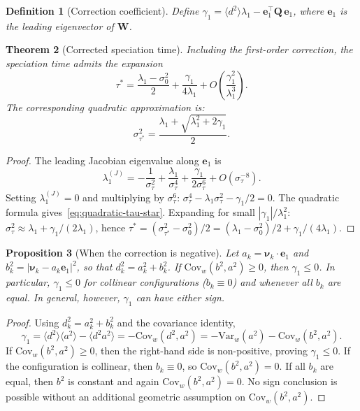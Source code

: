 \documentclass[11pt]{article}
\newtheorem{theorem}{Theorem}[section]
\newtheorem{proposition}[theorem]{Proposition}
\newtheorem{definition}[theorem]{Definition}
\newcommand{\Var}{\mathrm{Var}}
\newcommand{\Cov}{\mathrm{Cov}}
\begin{document}
\begin{definition}[Correction coefficient]\label{def:gamma}
Define $\gamma_1 = \langle d^2\rangle\lambda_1 - \bm{e}_1^\top\bm{Q}\,\bm{e}_1$, where $\bm{e}_1$ is the leading eigenvector of $\bm{W}$.
\end{definition}

\begin{theorem}[Corrected speciation time]\label{thm:corrected-speciation}
Including the first-order correction, the speciation time admits the expansion
\begin{equation}\label{eq:corrected-tau-star}
  \tau^\ast
  = \frac{\lambda_1 - \sigma_0^2}{2}
  + \frac{\gamma_1}{4\lambda_1}
  + O\!\left(\frac{\gamma_1^2}{\lambda_1^3}\right).
\end{equation}
The corresponding quadratic approximation is:
\begin{equation}\label{eq:quadratic-tau-star}
  \sigma_{\tau^\ast}^2
  = \frac{\lambda_1 + \sqrt{\lambda_1^2 + 2\gamma_1}}{2}.
\end{equation}
\end{theorem}

\begin{proof}
The leading Jacobian eigenvalue along $\bm{e}_1$ is
\[
  \lambda_1^{(J)} = -\frac{1}{\sigma_\tau^2} + \frac{\lambda_1}{\sigma_\tau^4} + \frac{\gamma_1}{2\sigma_\tau^6} + O(\sigma_\tau^{-8}).
\]
Setting $\lambda_1^{(J)} = 0$ and multiplying by $\sigma_\tau^6$: $\sigma_\tau^4 - \lambda_1\sigma_\tau^2 - \gamma_1/2 = 0$.
The quadratic formula gives~\eqref{eq:quadratic-tau-star}.
Expanding for small $|\gamma_1|/\lambda_1^2$:
$\sigma_\tau^2 \approx \lambda_1 + \gamma_1/(2\lambda_1)$,
hence $\tau^\ast = (\sigma_{\tau^\ast}^2 - \sigma_0^2)/2 = (\lambda_1 - \sigma_0^2)/2 + \gamma_1/(4\lambda_1)$.
\end{proof}

\begin{proposition}[When the correction is negative]\label{prop:gamma-sign}
Let $a_k = \bm{\nu}_k \cdot \bm{e}_1$ and $b_k^2 = |\bm{\nu}_k - a_k\bm{e}_1|^2$, so that $d_k^2 = a_k^2 + b_k^2$.
If $\Cov_w(b^2,a^2) \ge 0$, then $\gamma_1 \le 0$.
In particular, $\gamma_1 \le 0$ for collinear configurations ($b_k \equiv 0$) and whenever all $b_k$ are equal.
In general, however, $\gamma_1$ can have either sign.
\end{proposition}

\begin{proof}
Using $d_k^2 = a_k^2 + b_k^2$ and the covariance identity,
\[
  \gamma_1 = \langle d^2\rangle\langle a^2\rangle - \langle d^2 a^2\rangle
  = -\Cov_w(d^2,a^2)
  = -\Var_w(a^2) - \Cov_w(b^2,a^2).
\]
If $\Cov_w(b^2,a^2) \ge 0$, then the right-hand side is non-positive, proving $\gamma_1 \le 0$.
If the configuration is collinear, then $b_k \equiv 0$, so $\Cov_w(b^2,a^2)=0$.
If all $b_k$ are equal, then $b^2$ is constant and again $\Cov_w(b^2,a^2)=0$.
No sign conclusion is possible without an additional geometric assumption on $\Cov_w(b^2,a^2)$.
\end{proof}
\end{document}

